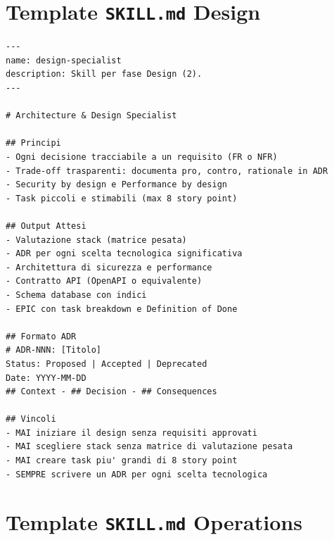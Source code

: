 \section{Template \texttt{SKILL.md} Design}

\begin{lstlisting}[language={},title={SKILL.md --- Architecture \& Design Specialist}]
---
name: design-specialist
description: Skill per fase Design (2).
---

# Architecture & Design Specialist

## Principi
- Ogni decisione tracciabile a un requisito (FR o NFR)
- Trade-off trasparenti: documenta pro, contro, rationale in ADR
- Security by design e Performance by design
- Task piccoli e stimabili (max 8 story point)

## Output Attesi
- Valutazione stack (matrice pesata)
- ADR per ogni scelta tecnologica significativa
- Architettura di sicurezza e performance
- Contratto API (OpenAPI o equivalente)
- Schema database con indici
- EPIC con task breakdown e Definition of Done

## Formato ADR
# ADR-NNN: [Titolo]
Status: Proposed | Accepted | Deprecated
Date: YYYY-MM-DD
## Context - ## Decision - ## Consequences

## Vincoli
- MAI iniziare il design senza requisiti approvati
- MAI scegliere stack senza matrice di valutazione pesata
- MAI creare task piu' grandi di 8 story point
- SEMPRE scrivere un ADR per ogni scelta tecnologica
\end{lstlisting}

\section{Template \texttt{SKILL.md} Operations}

